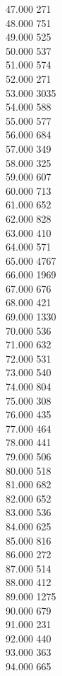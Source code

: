 { 47.000	271 \\
 48.000	751 \\
 49.000	525 \\
 50.000	537 \\
 51.000	574 \\
 52.000	271 \\
 53.000	3035 \\
 54.000	588 \\
 55.000	577 \\
 56.000	684 \\
 57.000	349 \\
 58.000	325 \\
 59.000	607 \\
 60.000	713 \\
 61.000	652 \\
 62.000	828 \\
 63.000	410 \\
 64.000	571 \\
 65.000	4767 \\
 66.000	1969 \\
 67.000	676 \\
 68.000	421 \\
 69.000	1330 \\
 70.000	536 \\
 71.000	632 \\
 72.000	531 \\
 73.000	540 \\
 74.000	804 \\
 75.000	308 \\
 76.000	435 \\
 77.000	464 \\
 78.000	441 \\
 79.000	506 \\
 80.000	518 \\
 81.000	682 \\
 82.000	652 \\
 83.000	536 \\
 84.000	625 \\
 85.000	816 \\
 86.000	272 \\
 87.000	514 \\
 88.000	412 \\
 89.000	1275 \\
 90.000	679 \\
 91.000	231 \\
 92.000	440 \\
 93.000	363 \\
 94.000	665 \\
}
